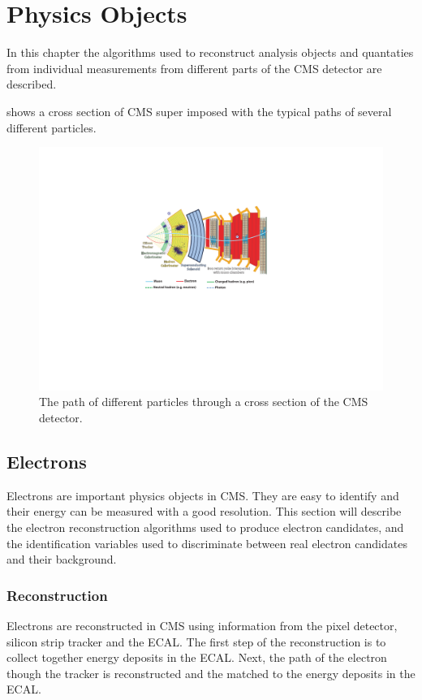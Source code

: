 \chapter{Physics Objects}

In this chapter the algorithms used to reconstruct analysis objects and
quantaties from individual measurements from different parts of the CMS detector
are described.

 shows a cross section of CMS super imposed with the
typical paths of several different particles.

\begin{figure}[htb]
  \centering
  \includegraphics[trim=8cm 8cm 8cm 5cm, width=\textwidth]{slice}
  \caption{The path of different particles through a cross section of the CMS detector.}
  \label{reco:crosssec}
\end{figure}

\section{Electrons}

Electrons are important physics objects in CMS. They are easy to identify and
their energy can be measured with a good resolution. This section will describe
the electron reconstruction algorithms used to produce electron candidates, and
the identification variables used to discriminate between real electron
candidates and their background.

\subsection{Reconstruction}
Electrons are reconstructed in CMS using information from the pixel detector,
silicon strip tracker and the ECAL.
The first step of the reconstruction is to collect together energy deposits in
the ECAL. Next, the path of the electron though the tracker is reconstructed and
the matched to the energy deposits in the ECAL.

